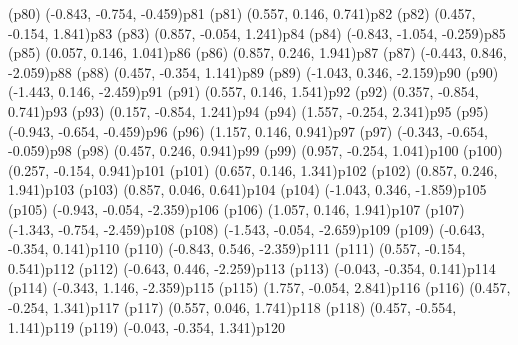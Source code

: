 \psdot[fillcolor=white](p80)
\psPoint(-0.843, -0.754, -0.459){p81}
\psdot[fillcolor=gray](p81)
\psPoint(0.557, 0.146, 0.741){p82}
\psdot[fillcolor=gray](p82)
\psPoint(0.457, -0.154, 1.841){p83}
\psdot[fillcolor=white](p83)
\psPoint(0.857, -0.054, 1.241){p84}
\psdot[fillcolor=gray](p84)
\psPoint(-0.843, -1.054, -0.259){p85}
\psdot[fillcolor=gray](p85)
\psPoint(0.057, 0.146, 1.041){p86}
\psdot[fillcolor=white](p86)
\psPoint(0.857, 0.246, 1.941){p87}
\psdot[fillcolor=white](p87)
\psPoint(-0.443, 0.846, -2.059){p88}
\psdot[fillcolor=white](p88)
\psPoint(0.457, -0.354, 1.141){p89}
\psdot[fillcolor=gray](p89)
\psPoint(-1.043, 0.346, -2.159){p90}
\psdot[fillcolor=white](p90)
\psPoint(-1.443, 0.146, -2.459){p91}
\psdot[fillcolor=white](p91)
\psPoint(0.557, 0.146, 1.541){p92}
\psdot[fillcolor=white](p92)
\psPoint(0.357, -0.854, 0.741){p93}
\psdot[fillcolor=gray](p93)
\psPoint(0.157, -0.854, 1.241){p94}
\psdot[fillcolor=gray](p94)
\psPoint(1.557, -0.254, 2.341){p95}
\psdot[fillcolor=gray](p95)
\psPoint(-0.943, -0.654, -0.459){p96}
\psdot[fillcolor=white](p96)
\psPoint(1.157, 0.146, 0.941){p97}
\psdot[fillcolor=gray](p97)
\psPoint(-0.343, -0.654, -0.059){p98}
\psdot[fillcolor=gray](p98)
\psPoint(0.457, 0.246, 0.941){p99}
\psdot[fillcolor=white](p99)
\psPoint(0.957, -0.254, 1.041){p100}
\psdot[fillcolor=gray](p100)
\psPoint(0.257, -0.154, 0.941){p101}
\psdot[fillcolor=white](p101)
\psPoint(0.657, 0.146, 1.341){p102}
\psdot[fillcolor=white](p102)
\psPoint(0.857, 0.246, 1.941){p103}
\psdot[fillcolor=white](p103)
\psPoint(0.857, 0.046, 0.641){p104}
\psdot[fillcolor=gray](p104)
\psPoint(-1.043, 0.346, -1.859){p105}
\psdot[fillcolor=white](p105)
\psPoint(-0.943, -0.054, -2.359){p106}
\psdot[fillcolor=gray](p106)
\psPoint(1.057, 0.146, 1.941){p107}
\psdot[fillcolor=white](p107)
\psPoint(-1.343, -0.754, -2.459){p108}
\psdot[fillcolor=gray](p108)
\psPoint(-1.543, -0.054, -2.659){p109}
\psdot[fillcolor=white](p109)
\psPoint(-0.643, -0.354, 0.141){p110}
\psdot[fillcolor=white](p110)
\psPoint(-0.843, 0.546, -2.359){p111}
\psdot[fillcolor=white](p111)
\psPoint(0.557, -0.154, 0.541){p112}
\psdot[fillcolor=gray](p112)
\psPoint(-0.643, 0.446, -2.259){p113}
\psdot[fillcolor=gray](p113)
\psPoint(-0.043, -0.354, 0.141){p114}
\psdot[fillcolor=gray](p114)
\psPoint(-0.343, 1.146, -2.359){p115}
\psdot[fillcolor=white](p115)
\psPoint(1.757, -0.054, 2.841){p116}
\psdot[fillcolor=gray](p116)
\psPoint(0.457, -0.254, 1.341){p117}
\psdot[fillcolor=white](p117)
\psPoint(0.557, 0.046, 1.741){p118}
\psdot[fillcolor=white](p118)
\psPoint(0.457, -0.554, 1.141){p119}
\psdot[fillcolor=gray](p119)
\psPoint(-0.043, -0.354, 1.341){p120}
